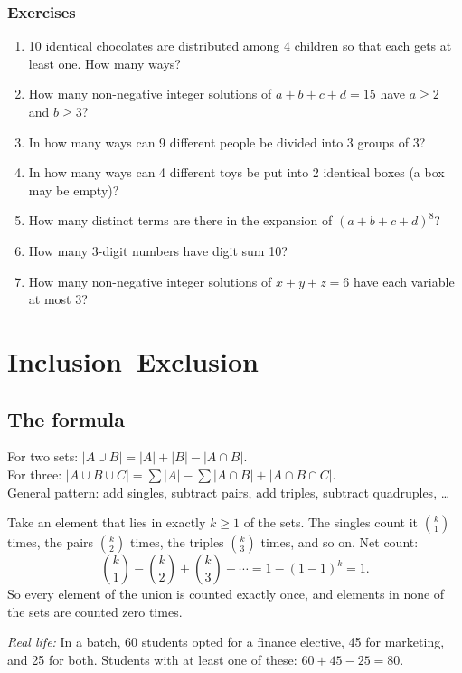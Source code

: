 \documentclass[11pt,a4paper,openany]{report}
\newenvironment{exercises}{\subsection*{Exercises \thechapter}\begin{enumerate}[label=\textbf{\thechapter.\arabic*},leftmargin=3.2em]}{\end{enumerate}}
\newcommand{\C}[2]{\binom{#1}{#2}}
\begin{document}
\begin{exercises}
\item 10 identical chocolates are distributed among 4 children so that each gets at least one. How many ways?
\item How many non-negative integer solutions of $a+b+c+d=15$ have $a\ge2$ and $b\ge3$?
\item In how many ways can 9 different people be divided into 3 groups of 3?
\item In how many ways can 4 different toys be put into 2 identical boxes (a box may be empty)?
\item How many distinct terms are there in the expansion of $(a+b+c+d)^8$?
\item How many 3-digit numbers have digit sum 10?
\item How many non-negative integer solutions of $x+y+z=6$ have each variable at most 3?
\end{exercises}

\chapter{Inclusion--Exclusion}\label{ch:ie}

\section{The formula}
For two sets: $|A\cup B|=|A|+|B|-|A\cap B|$.\\
For three: $|A\cup B\cup C|=\sum|A|-\sum|A\cap B|+|A\cap B\cap C|$.\\
General pattern: add singles, subtract pairs, add triples, subtract quadruples, \dots

\begin{why}
Take an element that lies in exactly $k\ge1$ of the sets. The singles count it $\C k1$ times, the pairs
$\C k2$ times, the triples $\C k3$ times, and so on. Net count:
\[\C k1-\C k2+\C k3-\cdots=1-(1-1)^k=1.\]
So every element of the union is counted exactly once, and elements in none of the sets are counted zero times.
\end{why}

\textit{Real life:} In a batch, 60 students opted for a finance elective, 45 for marketing, and 25
for both. Students with at least one of these: $60+45-25=80$.
\end{document}
